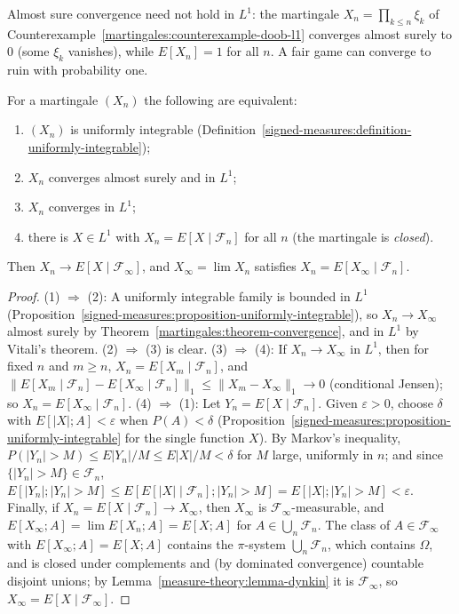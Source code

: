 \begin{counterexample}\label{martingales:counterexample-not-l1}
Almost sure convergence need not hold in $L^1$: the martingale $X_n = \prod_{k \leq n}\xi_k$ of Counterexample~\ref{martingales:counterexample-doob-l1} converges almost surely to $0$ (some $\xi_k$ vanishes), while
$E[X_n] = 1$ for all $n$. A fair game can converge to ruin with probability one.
\end{counterexample}

\begin{theorem}\label{martingales:theorem-ui-convergence}
For a martingale $(X_n)$ the following are equivalent:
\begin{enumerate}
\item $(X_n)$ is uniformly integrable (Definition~\ref{signed-measures:definition-uniformly-integrable});
\item $X_n$ converges almost surely and in $L^1$;
\item $X_n$ converges in $L^1$;
\item there is $X \in L^1$ with $X_n = E[X \mid \mathcal{F}_n]$ for all $n$ (the martingale is \emph{closed}).
\end{enumerate}
Then $X_n \to E[X \mid \mathcal{F}_\infty]$, and $X_\infty = \lim X_n$ satisfies $X_n = E[X_\infty \mid \mathcal{F}_n]$.
\end{theorem}

\begin{proof}
(1) $\Rightarrow$ (2): A uniformly integrable family is bounded in $L^1$ (Proposition~\ref{signed-measures:proposition-uniformly-integrable}), so $X_n \to X_\infty$ almost surely by Theorem~\ref{martingales:theorem-convergence}, and in $L^1$ by
Vitali's theorem. (2) $\Rightarrow$ (3) is clear. (3) $\Rightarrow$ (4): If $X_n \to X_\infty$ in $L^1$, then for fixed $n$ and $m \geq n$, $X_n = E[X_m \mid \mathcal{F}_n]$, and $\|E[X_m \mid \mathcal{F}_n] - E[X_\infty \mid \mathcal{F}_n]\|_1 \leq
\|X_m - X_\infty\|_1 \to 0$ (conditional Jensen); so $X_n = E[X_\infty \mid \mathcal{F}_n]$.
(4) $\Rightarrow$ (1): Let $Y_n = E[X \mid \mathcal{F}_n]$. Given $\varepsilon > 0$, choose $\delta$ with $E[|X|; A] < \varepsilon$ when $P(A) < \delta$ (Proposition~\ref{signed-measures:proposition-uniformly-integrable} for the single function $X$). By
Markov's inequality, $P(|Y_n| > M) \leq E|Y_n|/M \leq E|X|/M < \delta$ for $M$ large, uniformly in $n$; and since $\{|Y_n| > M\} \in \mathcal{F}_n$, $E[|Y_n|; |Y_n| > M] \leq E[E[|X| \mid \mathcal{F}_n]; |Y_n| > M] = E[|X|; |Y_n| > M] <
\varepsilon$.
Finally, if $X_n = E[X \mid \mathcal{F}_n] \to X_\infty$, then $X_\infty$ is $\mathcal{F}_\infty$-measurable, and $E[X_\infty; A] = \lim E[X_n; A] = E[X; A]$ for $A \in \bigcup_n\mathcal{F}_n$. The class of $A \in \mathcal{F}_\infty$ with $E[X_\infty; A] = E[X; A]$ contains the
$\pi$-system $\bigcup_n\mathcal{F}_n$, which contains $\Omega$, and is closed under complements and (by dominated convergence) countable disjoint unions; by Lemma~\ref{measure-theory:lemma-dynkin} it is $\mathcal{F}_\infty$, so
$X_\infty = E[X \mid \mathcal{F}_\infty]$.
\end{proof}

